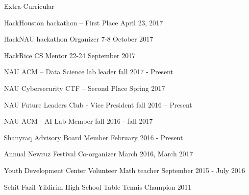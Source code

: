 \documentclass[14pt]{resume} %
\begin{document}
\begin{rSection}{Extra-Curricular} \itemsep -3pt
\item HackHouston hackathon – First Place \hfill April 23, 2017

\item  HackNAU hackathon Organizer \hfill 7-8 October 2017

\item  HackRice CS Mentor  \hfill 22-24 September 2017

\item  NAU ACM – Data Science lab leader \hfill fall 2017 - Present

\item NAU Cybersecurity CTF – Second Place \hfill Spring 2017 

\item NAU Future Leaders Club - Vice President \hfill fall 2016 – Present

\item NAU ACM - AI Lab Member \hfill fall 2016 - fall 2017

\item Shanyraq Advisory Board Member \hfill February 2016 - Present

\item Annual Newruz Festival Co-organizer \hfill March 2016, March 2017

\item Youth Development Center Volunteer Math teacher \hfill September 2015 - July 2016

\item Sehit Fazil Yildirim High School Table Tennis Champion  \hfill 2011





\end{rSection}
\end{document}
